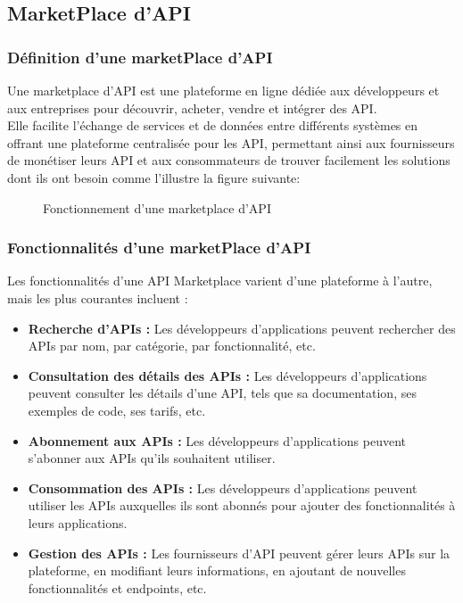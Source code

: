 \pagebreak

\subsection{ MarketPlace d'API }

    \subsubsection{ Définition d'une marketPlace d’API} 


    Une marketplace d'API est une plateforme en ligne dédiée aux développeurs et aux entreprises pour découvrir, acheter, vendre et intégrer des API. \\
        Elle facilite l'échange de services et de données entre différents systèmes en offrant une plateforme centralisée pour les API, permettant ainsi aux fournisseurs de monétiser leurs API et aux consommateurs de trouver facilement les solutions dont ils ont besoin comme l’illustre la figure suivante:
        \begin{figure}[H]    
            \centering
                \caption{ Fonctionnement d’une marketplace d’API \cite[]{marketplaceAPI} }
                \label{fig:logo_tt}
        \end{figure}
    \subsubsection{ Fonctionnalités d'une marketPlace d’API}

    Les fonctionnalités d'une API Marketplace varient d'une plateforme à l'autre, mais les plus courantes incluent :	
    \begin{itemize}
        \item    \textbf{Recherche d'APIs :}  Les développeurs d'applications peuvent rechercher des APIs par nom, par catégorie, par fonctionnalité, etc.
        \item  \textbf{Consultation des détails des APIs : }Les développeurs d'applications peuvent consulter les détails d'une API, tels que sa documentation, ses exemples de code, ses tarifs, etc.
        \item \textbf{Abonnement aux APIs : }Les développeurs d'applications peuvent s'abonner aux APIs qu'ils souhaitent utiliser.
        \item \textbf{Consommation des APIs :} Les développeurs d'applications peuvent utiliser les APIs auxquelles ils sont abonnés pour ajouter des fonctionnalités à leurs applications.
        \item  \textbf{Gestion des APIs :} Les fournisseurs d'API peuvent gérer leurs APIs sur la plateforme, en modifiant leurs informations, en ajoutant de nouvelles fonctionnalités et endpoints, etc.
    \end{itemize}
\pagebreak

